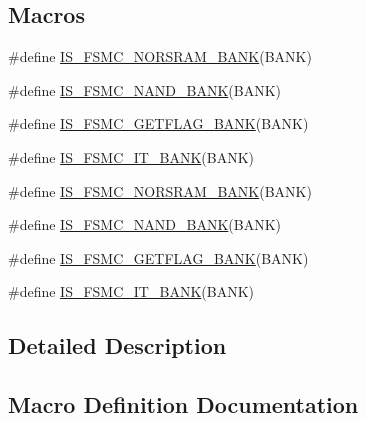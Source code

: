 \subsection*{Macros}
\begin{DoxyCompactItemize}
\item 
\#define \hyperlink{group___f_s_m_c___exported___constants_ga3e3bed3dd83d38e63f11ac4cbcb87304}{I\+S\+\_\+\+F\+S\+M\+C\+\_\+\+N\+O\+R\+S\+R\+A\+M\+\_\+\+B\+A\+NK}(B\+A\+NK)
\item 
\#define \hyperlink{group___f_s_m_c___exported___constants_ga725bada099197f15f49dc0c5be00e19b}{I\+S\+\_\+\+F\+S\+M\+C\+\_\+\+N\+A\+N\+D\+\_\+\+B\+A\+NK}(B\+A\+NK)
\item 
\#define \hyperlink{group___f_s_m_c___exported___constants_ga884e28a365a738ad8a3199ee279a1f77}{I\+S\+\_\+\+F\+S\+M\+C\+\_\+\+G\+E\+T\+F\+L\+A\+G\+\_\+\+B\+A\+NK}(B\+A\+NK)
\item 
\#define \hyperlink{group___f_s_m_c___exported___constants_gaca216ea0c184b78f23df15296a10bac0}{I\+S\+\_\+\+F\+S\+M\+C\+\_\+\+I\+T\+\_\+\+B\+A\+NK}(B\+A\+NK)
\item 
\#define \hyperlink{group___f_s_m_c___exported___constants_ga3e3bed3dd83d38e63f11ac4cbcb87304}{I\+S\+\_\+\+F\+S\+M\+C\+\_\+\+N\+O\+R\+S\+R\+A\+M\+\_\+\+B\+A\+NK}(B\+A\+NK)
\item 
\#define \hyperlink{group___f_s_m_c___exported___constants_ga725bada099197f15f49dc0c5be00e19b}{I\+S\+\_\+\+F\+S\+M\+C\+\_\+\+N\+A\+N\+D\+\_\+\+B\+A\+NK}(B\+A\+NK)
\item 
\#define \hyperlink{group___f_s_m_c___exported___constants_ga884e28a365a738ad8a3199ee279a1f77}{I\+S\+\_\+\+F\+S\+M\+C\+\_\+\+G\+E\+T\+F\+L\+A\+G\+\_\+\+B\+A\+NK}(B\+A\+NK)
\item 
\#define \hyperlink{group___f_s_m_c___exported___constants_gaca216ea0c184b78f23df15296a10bac0}{I\+S\+\_\+\+F\+S\+M\+C\+\_\+\+I\+T\+\_\+\+B\+A\+NK}(B\+A\+NK)
\end{DoxyCompactItemize}


\subsection{Detailed Description}


\subsection{Macro Definition Documentation}
